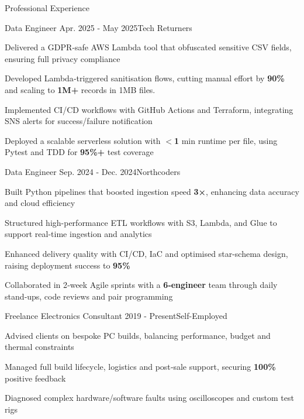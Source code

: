 \begin{rSection}{\normalsize Professional Experience} \itemsep -3pt  
\begin{rSubsection}{Data Engineer} {Apr. 2025 - May 2025}{Tech Returners}{}
\item Delivered a GDPR‑safe AWS Lambda tool that obfuscated sensitive CSV fields, ensuring full privacy compliance
\item  Developed Lambda‑triggered sanitisation flows, cutting manual effort by \textbf{90\%} and scaling to \textbf{1M+} records in 1MB files.
\item Implemented CI/CD workflows with GitHub Actions and Terraform, integrating SNS alerts for success/failure notification
\item Deployed a scalable serverless solution with \textbf{$<$1} min runtime per file, using Pytest and TDD for \textbf{95\%+} test coverage
\end{rSubsection}


\begin{rSubsection}{Data Engineer} {Sep. 2024 - Dec. 2024}{Northcoders}{}
\item Built Python pipelines that boosted ingestion speed \textbf{3×}, enhancing data accuracy and cloud efficiency
\item Structured high-performance ETL workflows with S3, Lambda, and Glue to support real-time ingestion and analytics
\item Enhanced delivery quality with CI/CD, IaC and optimised star-schema design, raising deployment success to \textbf{95\%}
\item Collaborated in 2‑week Agile sprints with a \textbf{6‑engineer} team through daily stand‑ups, code reviews and pair programming

\end{rSubsection}


\begin{rSubsection}{Freelance Electronics Consultant} {2019 - Present}{Self-Employed}{}
\item Advised clients on bespoke PC builds, balancing performance, budget and thermal constraints
\item Managed full build lifecycle, logistics and post‑sale support, securing \textbf{100\%} positive  feedback
\item Diagnosed complex hardware/software faults using oscilloscopes and custom test rigs

\end{rSubsection}
\vspace{-0.2cm}
\end{rSection}
